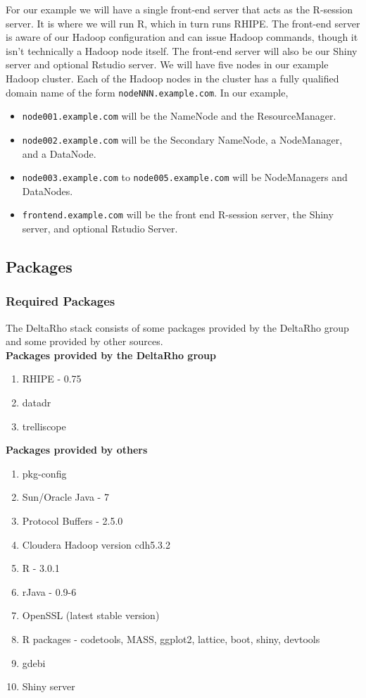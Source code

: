For our example we will have a single front-end server that acts as the
R-session server.  It is where we will run R, which in turn runs RHIPE.
The front-end server is aware of our Hadoop configuration and can issue
Hadoop commands, though it isn't technically a Hadoop node itself. The
front-end server will also be our Shiny server and optional Rstudio
server.  We will have five nodes in our example Hadoop cluster.  Each of
the Hadoop nodes in the cluster has a fully qualified domain
name of the form \verb|nodeNNN.example.com|. In our example,

\begin{itemize}
\item \verb|node001.example.com| will be the NameNode and the ResourceManager.
\item \verb|node002.example.com| will be the Secondary NameNode, a NodeManager, and a DataNode.
\item \verb|node003.example.com| to \verb|node005.example.com| will be NodeManagers and DataNodes.
\item \verb|frontend.example.com| will be the front end R-session server, the Shiny server, and optional Rstudio Server.
\end{itemize}

\subsection{Packages}
\subsubsection{Required Packages}
The DeltaRho stack consists of some packages provided by the DeltaRho group and some provided by other sources. \\

\textbf{Packages provided by the DeltaRho group}
\begin{enumerate}
\item RHIPE - 0.75
\item datadr
\item trelliscope
\end{enumerate}
\textbf{Packages provided by others}
\begin{enumerate}
\item pkg-config
\item Sun/Oracle Java - 7
\item Protocol Buffers - 2.5.0
\item Cloudera Hadoop version cdh5.3.2
\item R - 3.0.1
\item rJava - 0.9-6
\item OpenSSL (latest stable version)
\item R packages - codetools, MASS, ggplot2, lattice, boot, shiny, devtools
\item gdebi
\item Shiny server
\end{enumerate}

